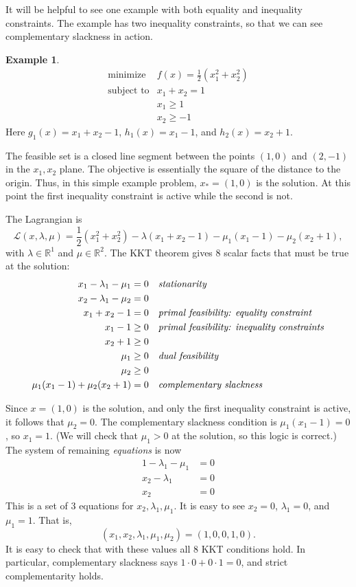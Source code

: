 \documentclass[12pt]{amsart}
\theoremstyle{definition}
\newtheorem*{example}{Example}
\newcommand{\RR}{\mathbb{R}}
\begin{document}
It will be helpful to see one example with both equality and inequality constraints.  The example has two inequality constraints, so that we can see complementary slackness in action.

\begin{example}
    $$\begin{matrix}
    \text{minimize}   & f(x) = \frac{1}{2} \left(x_1^2 + x_2^2\right) \\
    \text{subject to} & x_1 + x_2 = 1 \\
                      & x_1 \ge 1 \\
                      & x_2 \ge -1
\end{matrix}$$
Here $g_1(x) = x_1 + x_2 -1$, $h_1(x) = x_1 - 1$, and $h_2(x) = x_2 + 1$.

The feasible set is a closed line segment between the points $(1,0)$ and $(2,-1)$ in the $x_1,x_2$ plane.  The objective is essentially the square of the distance to the origin.  Thus, in this simple example problem, $x_*=(1,0)$ is the solution.  At this point the first inequality constraint is active while the second is not.

The Lagrangian is
	$$\mathcal{L}(x,\lambda,\mu) = \frac{1}{2} \left(x_1^2 + x_2^2\right) - \lambda(x_1 + x_2 - 1) - \mu_1 (x_1 - 1) - \mu_2(x_2 + 1),$$
with $\lambda \in \RR^1$ and $\mu \in \RR^2$.  The KKT theorem gives 8 scalar facts that must be true at the solution:
\begin{align*}
x_1 - \lambda_1 - \mu_1 &= 0 &&\text{\emph{stationarity}} \\
x_2 - \lambda_1 - \mu_2 &= 0 \\
x_1 + x_2 -1 &= 0  &&\text{\emph{primal feasibility: equality constraint}} \\
x_1 - 1 &\ge 0  &&\text{\emph{primal feasibility: inequality constraints}} \\
x_2 + 1 &\ge 0 \\
\mu_1 &\ge 0 &&\text{\emph{dual feasibility}} \\
\mu_2 &\ge 0 \\
\mu_1 (x_1 - 1) + \mu_2 (x_2 + 1) &= 0 &&\text{\emph{complementary slackness}}
\end{align*}

Since $x=(1,0)$ is the solution, and only the first inequality constraint is active, it follows that $\mu_2=0$.  The complementary slackness condition is $\mu_1 (x_1-1)=0$, so $x_1=1$.  (We will check that $\mu_1>0$ at the solution, so this logic is correct.)  The system of remaining \emph{equations} is now
\begin{align*}
1 - \lambda_1 - \mu_1 &= 0 \\
x_2 - \lambda_1 &= 0 \\
x_2 &= 0
\end{align*}
This is a set of 3 equations for $x_2,\lambda_1,\mu_1$.  It is easy to see $x_2=0$, $\lambda_1=0$, and $\mu_1=1$.  That is,
   $$(x_1,x_2,\lambda_1,\mu_1,\mu_2) = (1,0,0,1,0).$$
It is easy to check that with these values all 8 KKT conditions hold.  In particular, complementary slackness says $1 \cdot 0 + 0 \cdot 1 = 0$, and strict complementarity holds.
\end{example}
\end{document}
